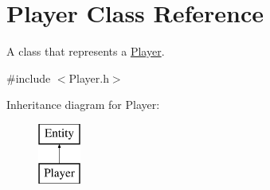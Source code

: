 \hypertarget{class_player}{\section{Player Class Reference}
\label{class_player}
}


A class that represents a \hyperlink{class_player}{Player}.  




{\ttfamily \#include $<$Player.\+h$>$}

Inheritance diagram for Player\+:\begin{figure}[H]
\begin{center}
\leavevmode
\includegraphics[height=2.000000cm]{class_player}
\end{center}
\end{figure}
